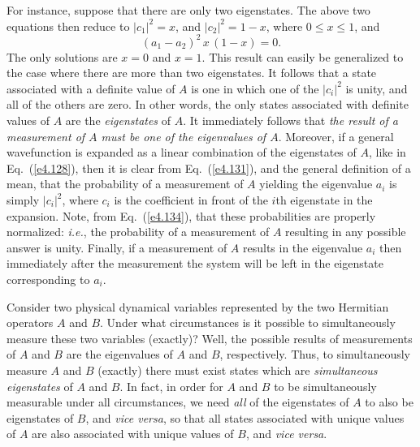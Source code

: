 For instance, suppose that there are only two eigenstates. The above two
equations then reduce to $|c_1|^2=x$, and $|c_2|^2=1-x$, where $0\leq x\leq 1$,
and
\begin{equation}\label{e4.126}
(a_1-a_2)^2\,x\,(1-x) = 0.
\end{equation}
The only solutions are $x=0$ and $x=1$. This result can easily
be generalized to the case where there are more than two eigenstates.
It follows that a state associated with a definite value of $A$ is
one in which one of the $|c_i|^2$ is unity, and all of the others are zero.
In other words, the only states associated with definite values of $A$
are the {\em eigenstates} of $A$. It immediately
follows that {\em the result of a measurement of $A$ must be one of the eigenvalues of $A$}. Moreover, if a general wavefunction is expanded
as a linear combination of the eigenstates of $A$, like in Eq.~(\ref{e4.128}),
then it is clear from Eq.~(\ref{e4.131}), and the general definition of a mean,
that the probability of a measurement of $A$ yielding the eigenvalue $a_i$
is simply $|c_i|^2$, where $c_i$ is the coefficient in front of
the $i$th eigenstate in the expansion. Note, from Eq.~(\ref{e4.134}),
that these probabilities are properly normalized: {\em i.e.}, the probability
of a measurement of $A$ resulting in  any possible answer is unity.
Finally, if a measurement of $A$ results in the eigenvalue $a_i$ then
immediately after the measurement the system will be left in the
eigenstate corresponding to $a_i$.

Consider two physical dynamical variables represented by the two
Hermitian operators $A$ and $B$. Under what circumstances is
it possible to simultaneously measure these two variables (exactly)? 
Well, the possible results of measurements of $A$ and $B$ are the eigenvalues
of $A$ and $B$, respectively. Thus, to simultaneously measure $A$ and $B$ (exactly) there
must exist states which are {\em simultaneous eigenstates}\/ of $A$ and $B$. 
In fact,  in order for $A$ and $B$ to be simultaneously measurable under all
circumstances, we need {\em all}\/ of the eigenstates of $A$ to also be eigenstates of $B$, and {\em vice versa}, so that all states associated with unique values of $A$ are
also associated with unique values of $B$, and {\em vice versa}.

